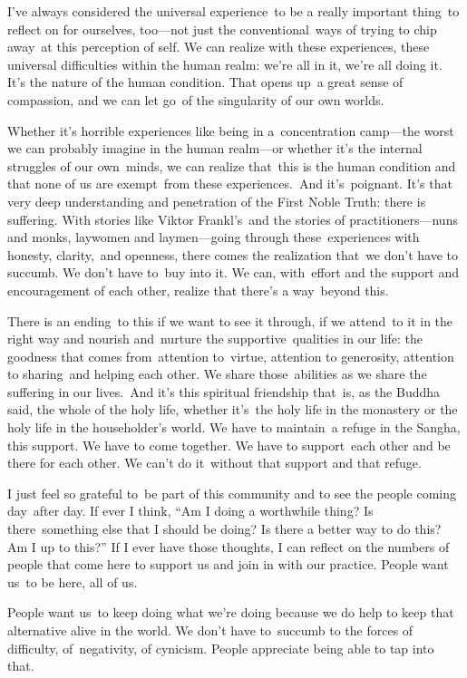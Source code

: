 I've always considered the universal experience~to be a really important thing~to reflect on for ourselves, too---not just the conventional~ways of trying to chip away~at this perception of self. We can realize with these experiences, these universal difficulties within the human realm: we're all in it, we're all doing it. It's the nature of the human condition. That opens up~a great sense of compassion, and we can let go~of the singularity of our own worlds.

Whether it's horrible experiences like being in a~concentration camp---the worst we can probably imagine in the human realm---or whether it's the internal struggles of our own~minds, we can realize that~this is the human condition and that none of us are exempt~from these experiences.~And it's~poignant. It's that very deep understanding and penetration of the First Noble Truth: there is suffering. With stories like Viktor Frankl's~and the stories of practitioners---nuns and monks, laywomen and laymen---going through these~experiences with honesty, clarity,~and openness, there comes the realization that~we don't have to succumb. We don't have to~buy into it. We can, with~effort and the support and encouragement of each other, realize that there's a way~beyond this.

There is an ending~to this if we want to see it through, if we attend~to it in the right way and nourish and~nurture the supportive~qualities in our life: the goodness that comes from~attention to~virtue, attention to generosity, attention to sharing~and helping each other. We share those~abilities as we share the suffering in our lives.~And it's this spiritual friendship that~is, as the Buddha said, the whole of the holy life, whether it's~the holy life in the monastery or the holy life in the householder's world. We have to maintain~a refuge in the Sangha, this support. We have to come together. We have to support~each other and be there for each other. We can't do it~without that support and that refuge.

I just feel so grateful to~be part of this community and to see the people coming day~after day. If ever I think, ``Am I doing a worthwhile thing? Is there~something else that I should be doing? Is there a better way to do this? Am I up to this?'' If I ever have those thoughts, I can reflect on the numbers of people that come here to support us and join in with our practice. People want us~to be here, all of us.

People want us~to keep doing what we're doing because we do help to keep that alternative alive in the world. We don't have to~succumb to the forces of difficulty, of~negativity, of cynicism. People appreciate being able to tap into that.


